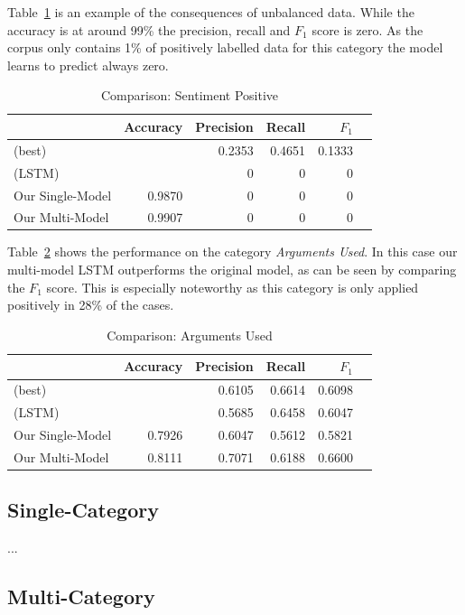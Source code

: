 \documentclass[11pt,a4paper]{article}
\begin{document}
Table~\ref{tab:results:sentiment_positive} is an example of the consequences of unbalanced data. While the accuracy is at around 99\% the precision, recall and $F_1$ score is zero. As the corpus only contains 1\% of positively labelled data for this category the model learns to predict always zero.
\begin{table}[h!]
	\centering\tiny
	\begin{tabular}{l r r r r r}
		& Accuracy & Precision & Recall & $F_1$ \\
		\hline
		\cite{Schabus17} (best) & & 0.2353 & 0.4651 & 0.1333 \\
		\cite{Schabus17} (LSTM) & & 0 & 0 & 0\\
		\hline
		Our Single-Model & 0.9870 & 0 & 0 & 0 \\
		Our Multi-Model & 0.9907 & 0 & 0 & 0 \\
	\end{tabular}
	\caption{Comparison: Sentiment Positive}
	\label{tab:results:sentiment_positive}
\end{table}

Table~\ref{tab:results:arguments_used} shows the performance on the category \textit{Arguments Used}. In this case our multi-model LSTM outperforms the original model, as can be seen by comparing the $F_1$ score. This is especially noteworthy as this category is only applied positively in 28\% of the cases.  
\begin{table}[h!]
	\centering\tiny
	\begin{tabular}{l r r r r r}
		& Accuracy & Precision & Recall & $F_1$ \\
		\hline
		\cite{Schabus17} (best) & & 0.6105 & 0.6614 & 0.6098 \\
		\cite{Schabus17} (LSTM) & & 0.5685 & 0.6458 & 0.6047\\
		\hline
		Our Single-Model & 0.7926 & 0.6047 & 0.5612 & 0.5821 \\
		Our Multi-Model & 0.8111 & 0.7071 & 0.6188 & 0.6600 \\
	\end{tabular}
	\caption{Comparison: Arguments Used}
	\label{tab:results:arguments_used}
\end{table}


\subsection{Single-Category}

...


\subsection{Multi-Category}
\end{document}
